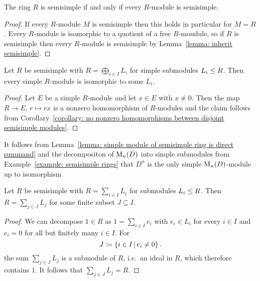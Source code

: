\begin{proposition}
  The ring $R$ is semisimple if and only if every $R$-module is semisimple.
\end{proposition}


\begin{proof}
  If every $R$-module $M$ is semisimple then this holds in particular for $M = R$.
  Every $R$-module is isomorphic to a quotient of a free $R$-moudule, so if $R$ is semisimple then every $R$-module is semisimple by Lemma~\ref{lemma: inherit semisimple}.
\end{proof}


\begin{lemma}
  \label{lemma: simple module of semisimple ring is direct summand}
  Let $R$ be semisimple with $R = \bigoplus_{i \in I} L_i$ for simple submodules $L_i \leq R$.
  Then every simple $R$-module is isomorphic to some $L_i$.
\end{lemma}




\begin{proof}
  Let $E$ be a simple $R$-module and let $x \in E$ with $x \neq 0$.
  Then the map $R \to E$, $r \mapsto rx$ is a nonzero homomorphism of $R$-modules and the claim follows from Corollary~\ref{corollary: no nonzero homomorphisms between disjoint semisimple modules}.
\end{proof}


\begin{example}
  \label{example: D^n is the only simple M_n(D)-module}
  It follows from Lemma~\ref{lemma: simple module of semisimple ring is direct summand} and the decompositon of $\operatorname{M}_n(D)$ into simple submodules from Example~\ref{example: semisimple rings} that $D^n$ is the only simple $\operatorname{M}_n(D)$-module up to isomorphism
\end{example}


\begin{lemma}
  \label{lemma: ring is already finite sum of submodules}
  Let $R$ be semisimple with $R = \sum_{i \in I} L_i$ for submodules $L_i \leq R$.
  Then $R = \sum_{j \in J} L_j$ for some finite subset $J \subseteq I$.
\end{lemma}


\begin{proof}
  We can decompose $1 \in R$ as $1 = \sum_{i \in I} e_i$ with $e_i \in L_i$ for every $i \in I$ and $e_i = 0$ for all but finitely many $i \in I$.
  For
  \[
              J
    \defined  \{ i \in I \suchthat e_i \neq 0 \} \,.
  \]
  the sum $\sum_{j \in J} L_j$ is a submodule of $R$, i.e.\ an ideal in $R$, which therefore contains $1$.
  It follows that $\sum_{j \in J} L_j = R$.
\end{proof}


